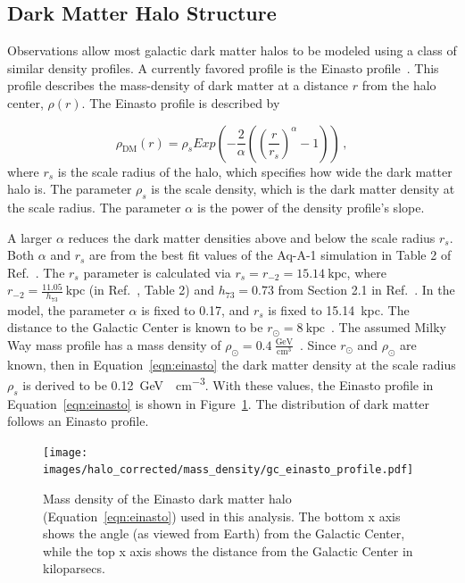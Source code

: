   \subsection{Dark Matter Halo Structure}\label{dm_spatial}
    
    Observations allow most galactic dark matter halos to be modeled using a class of similar density profiles.
    A currently favored profile is the Einasto profile~\cite{einastoprofile1,einastoprofile2}.
    This profile describes the mass-density of dark matter at a distance $r$ from the halo center, $\rho(r)$.
    The Einasto profile is described by

    \begin{equation} \label{eqn:einasto}
      \rho_{\textrm{DM}} \left( r \right) = \rho_{s} Exp \left( - \frac{2}{\alpha} \left( {\left( \frac{r}{r_s} \right)}^{\alpha} - 1 \right) \right) \,,
    \end{equation}
    where $r_s$ is the scale radius of the halo, which specifies how wide the dark matter halo is.
    The parameter $\rho_s$ is the scale density, which is the dark matter density at the scale radius.
    The parameter $\alpha$ is the power of the density profile's slope.
    
    A larger $\alpha$ reduces the dark matter densities above and below the scale radius $r_s$.
    Both $\alpha$ and $r_s$ are from the best fit values of the Aq-A-1 simulation in Table 2 of Ref.~\cite{mw_halo_params}.
    The $r_s$ parameter is calculated via $r_s=r_{-2}=15.14\:\textrm{kpc}$, where $r_{-2}=\frac{11.05}{h_{73}}\:\textrm{kpc}$ (in Ref.~\cite{mw_halo_params}, Table 2) and $h_{73}=0.73$ from Section 2.1 in Ref.~\cite{mw_halo_params}.
    In the model, the parameter $\alpha$ is fixed to 0.17, and $r_s$ is fixed to \SI{15.14}{kpc}.
    The distance to the Galactic Center is known to be $r_\odot=8\:\textrm{kpc}$~\cite{gc_distance_1,gc_distance_2,gc_distance_3}.
    The assumed Milky Way mass profile has a mass density of $\rho_\odot = 0.4\:\frac{\textrm{GeV}}{\textrm{cm}^3}$~\cite{local_dm_density,direct_dm_astrophysical_uncertainties}.
    Since $r_\odot$ and $\rho_\odot$ are known, then in Equation~\ref{eqn:einasto} the dark matter density at the scale radius $\rho_s$ is derived to be \SI{0.12}{\GeV{}\per\cm^3}.
    With these values, the Einasto profile in Equation~\ref{eqn:einasto} is shown in Figure~\ref{fig:gchalo_density}.
    The distribution of dark matter follows an Einasto profile.
  
    \begin{figure}[!t]
      \centering
      \texttt{[image: images/halo\_corrected/mass\_density/gc\_einasto\_profile.pdf]}
      \caption[Galactic Center Einasto Halo Density]{
        Mass density of the Einasto dark matter halo (Equation~\ref{eqn:einasto}) used in this analysis.
        The bottom x axis shows the angle (as viewed from Earth) from the Galactic Center, while the top x axis shows the distance from the Galactic Center in kiloparsecs.
        \CaptionBlankLine
        }
      \label{fig:gchalo_density}
    \end{figure}


